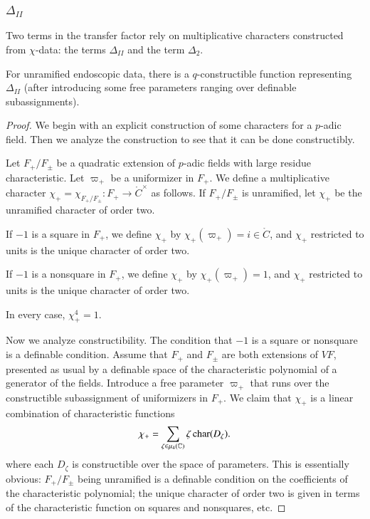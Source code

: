 \subsubsection{$\Delta_{II}$}
Two terms in the transfer factor rely on multiplicative characters
constructed from $\chi$-data: the terms $\Delta_{II}$ and the term
$\Delta_2$.

\begin{lemma}  
  For unramified endoscopic data,
  there is a $q$-constructible function representing $\Delta_{II}$
  (after introducing some free parameters ranging over definable
  subassignments).
\end{lemma}

\begin{proof}  
  We begin with an explicit construction of some characters for a
  $p$-adic field.  Then we analyze the construction to see that it can
  be done constructibly.

  Let $F_+/F_\pm$ be a quadratic extension of $p$-adic fields with
  large residue characteristic.  Let
  $\varpi_+$ be a uniformizer in $F_+$.  We define a multiplicative
  character $\chi_+ = \chi_{F_+/F_{\pm}}:F_+\to \ring{C}^\times$ as
  follows.  If $F_+/F_\pm$ is unramified, let $\chi_+$ be the
  unramified character of order two.

  If $-1$ is a square in $F_+$, we define $\chi_+$ by
  $\chi_+(\varpi_+) = i\in\ring{C}$, and $\chi_+$ restricted to units
  is the unique character of order two.

  If $-1$ is a nonsquare in $F_+$, we define $\chi_+$ by
  $\chi_+(\varpi_+)=1$, and $\chi_+$ restricted to units is the unique
  character of order two.

  In every case, $\chi_+^4 = 1$.

  Now we analyze constructibility.  The condition that $-1$ is a
  square or nonsquare is a definable condition.  Assume that $F_+$ and
  $F_\pm$ are both extensions of $VF$, presented as usual by a
  definable space of the characteristic polynomial of a generator of
  the fields.  Introduce a free parameter $\varpi_+$ that runs over
  the constructible subassignment of uniformizers in $F_+$.  We claim
  that $\chi_+$ is a linear combination of characteristic functions
\[
\chi_+ = \sum_{\zeta\in\mu_4(\mathbb{C})} \zeta\, {\operatorname{char}}(D_\zeta).
\]
where each $D_\zeta$ is constructible over the space of parameters.
This is essentially obvious: $F_+/F_\pm$ being unramified is a
definable condition on the coefficients of the characteristic
polynomial; the unique character of order two is given in terms of the
characteristic function on squares and nonsquares, etc.


\end{proof}
